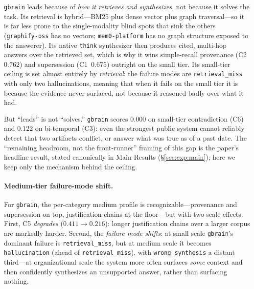 \texttt{gbrain} leads because of \emph{how it retrieves and synthesizes}, not
because it solves the task. Its retrieval is hybrid---BM25 plus dense vector
plus graph traversal---so it is far less prone to the single-modality blind spots
that sink the others (\texttt{graphify-oss} has no vectors;
\texttt{mem0-platform} has no graph structure exposed to the answerer). Its
native \texttt{think} synthesizer then produces cited, multi-hop answers over the
retrieved set, which is why it wins simple-recall provenance (C2~$0.762$) and
supersession (C1~$0.675$) outright on the small tier. Its small-tier ceiling is
set almost entirely by \emph{retrieval}: the failure modes are
\texttt{retrieval\_miss} with only two hallucinations, meaning that when
it fails on the small tier it is because the evidence never surfaced, not because
it reasoned badly over what it had.

But ``leads'' is not ``solves.'' \texttt{gbrain} scores $0.000$ on small-tier
contradiction (C6) and $0.122$ on bi-temporal (C3): even the strongest public
system cannot reliably detect that two artifacts conflict, or answer what was
true as of a past date. The ``remaining headroom, not the front-runner'' framing
of this gap is the paper's headline result, stated canonically in Main Results
(\S\ref{sec:exp:main}); here we keep only the mechanism behind the ceiling.

\paragraph{Medium-tier failure-mode shift.}
{\sloppy
For \texttt{gbrain}, the per-category medium profile is recognizable---provenance
and supersession on top, justification chains at the floor---but with two scale
effects. First, C5 \emph{degrades} ($0.411 \rightarrow 0.216$): longer
justification chains over a larger corpus are markedly harder. Second, the
\emph{failure mode shifts}: at small scale \texttt{gbrain}'s dominant failure is
\texttt{retrieval\_miss}, but at medium scale it becomes \texttt{hallucination}
(ahead of \texttt{retrieval\_miss}), with \texttt{wrong\_synthesis} a distant
third---at organizational scale the system more often surfaces \emph{some} context
and then confidently synthesizes an unsupported answer, rather than surfacing
nothing.\par}

